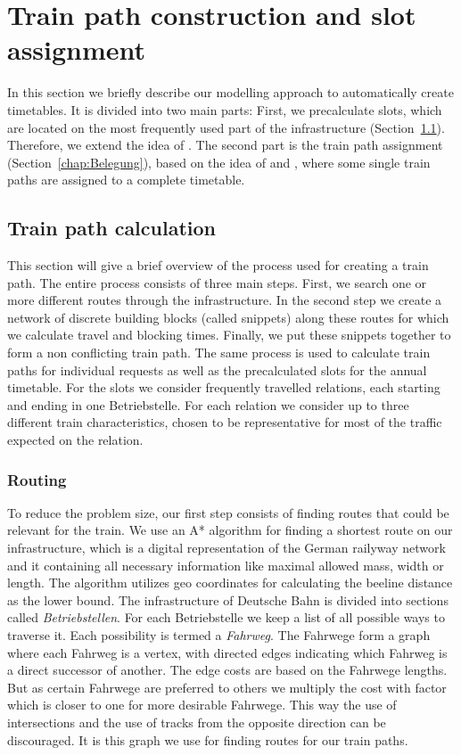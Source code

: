 \section{Train path construction and slot assignment}
\label{chap:methods}
%
In this section we briefly describe our modelling approach to automatically create timetables. It is divided into two main parts: First, we precalculate slots, which are located on the most frequently used part of the infrastructure (Section~\ref{chap:Konstruktion}). Therefore, we extend the idea of \cite{O:2009}. The second part is the train path assignment (Section~\ref{chap:Belegung}), based on the idea of \cite{N:1998, N:2015} and \cite{NO:2014}, where some single train paths are assigned to a complete timetable.


\subsection{Train path calculation}
\label{chap:Konstruktion}
%
This section will give a brief overview of the process used for creating a train path. The entire process consists of three main steps. First, we search one or more different routes through the infrastructure. In the second step we create a network of discrete building blocks (called snippets) along these routes for which we calculate travel and blocking times. Finally, we put these snippets together to form a non conflicting train path. The same process is used to calculate train paths for individual requests as well as the precalculated slots for the annual timetable. For the slots we consider frequently travelled relations, each starting and ending in one Betriebstelle. For each relation we consider up to three different train characteristics, chosen to be representative for most of the traffic expected on the relation.


\subsubsection{Routing}
To reduce the problem size, our first step consists of finding routes that could be relevant for the train. We use an A* algorithm for finding a shortest route on our infrastructure, which is a digital representation of the German railyway network and it containing all necessary information like maximal allowed mass, width or length. The algorithm utilizes geo coordinates for calculating the beeline distance as the lower bound. The infrastructure of Deutsche Bahn is divided into sections called \emph{Betriebstellen}.
For each Betriebstelle we keep a list of all possible ways to traverse it. Each possibility is termed a \emph{Fahrweg}. The Fahrwege form a graph where each Fahrweg is a vertex, with directed edges indicating which Fahrweg is a direct successor of another. The edge costs are based on the Fahrwege lengths.
But as certain Fahrwege are preferred to others we multiply the cost with factor which is closer to one for more desirable Fahrwege. This way the use of intersections and the use of tracks from the opposite direction can be discouraged. It is this graph we use for finding routes for our train paths.


